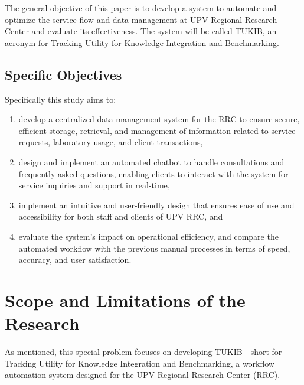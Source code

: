 The general objective of this paper is to develop a system to automate and optimize the service flow and data management at UPV Regional Research Center and evaluate its effectiveness. The system will be called TUKIB, an acronym for Tracking Utility for Knowledge Integration and Benchmarking. 

\subsection{Specific Objectives}
\label{sec:specificobjectives}

Specifically this study aims to:

\begin{enumerate}
	
	\item develop a centralized data management system for the RRC to ensure secure, efficient storage, retrieval, and management of information related to service requests, laboratory usage, and client transactions,
	
	\item design and implement an automated chatbot to handle consultations and frequently asked questions, enabling clients to interact with the system for service inquiries and support in real-time,
	
	
	\item implement an intuitive and user-friendly design that ensures ease of use and accessibility for both staff and clients of UPV RRC, and
	
	\item evaluate the system’s impact on operational efficiency, and compare the automated workflow with the previous manual processes in terms of speed, accuracy, and user satisfaction.
	
\end{enumerate}

\section{Scope and Limitations of the Research}
\label{sec:scopelimitations}

As mentioned, this special problem focuses on developing TUKIB - short for Tracking Utility for Knowledge Integration and Benchmarking, a workflow automation system designed for the UPV Regional Research Center (RRC). 

